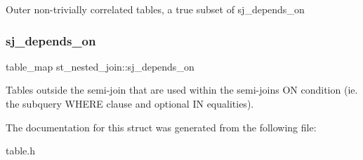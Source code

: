 Outer non-\/trivially correlated tables, a true subset of sj\+\_\+depends\+\_\+on \mbox{\label{structst__nested__join_a9076f50ec461d7ff2340d77f89fac1e9}} 
\subsubsection{\texorpdfstring{sj\+\_\+depends\+\_\+on}{sj\_depends\_on}}
{\footnotesize\ttfamily table\+\_\+map st\+\_\+nested\+\_\+join\+::sj\+\_\+depends\+\_\+on}

Tables outside the semi-\/join that are used within the semi-\/join\textquotesingle{}s ON condition (ie. the subquery W\+H\+E\+RE clause and optional IN equalities). 

The documentation for this struct was generated from the following file\+:\begin{DoxyCompactItemize}
\item 
table.\+h\end{DoxyCompactItemize}
